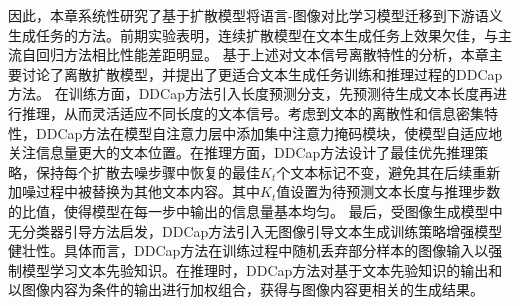 因此，本章系统性研究了基于扩散模型将语言-图像对比学习模型迁移到下游语义生成任务的方法。前期实验表明，连续扩散模型在文本生成任务上效果欠佳，与主流自回归方法\cite{OSCAR,VinVL,UFO,ViTCap,SimVLM,GIT}相比性能差距明显。
基于上述对文本信号离散特性的分析，本章主要讨论了离散扩散模型\cite{VQ-diffusion}，并提出了更适合文本生成任务训练和推理过程的DDCap方法。
在训练方面，DDCap方法引入长度预测分支，先预测待生成文本长度再进行推理，从而灵活适应不同长度的文本信号。考虑到文本的离散性和信息密集特性，DDCap方法在模型自注意力层中添加集中注意力掩码模块，使模型自适应地关注信息量更大的文本位置。在推理方面，DDCap方法设计了最佳优先推理策略，保持每个扩散去噪步骤中恢复的最佳$K_{t}$个文本标记不变，避免其在后续重新加噪过程中被替换为其他文本内容。其中$K_{t}$值设置为待预测文本长度与推理步数的比值，使得模型在每一步中输出的信息量基本均匀。
最后，受图像生成模型中无分类器引导方法\cite{glide}启发，DDCap方法引入无图像引导文本生成训练策略增强模型健壮性。具体而言，DDCap方法在训练过程中随机丢弃部分样本的图像输入以强制模型学习文本先验知识。在推理时，DDCap方法对基于文本先验知识的输出和以图像内容为条件的输出进行加权组合，获得与图像内容更相关的生成结果。

